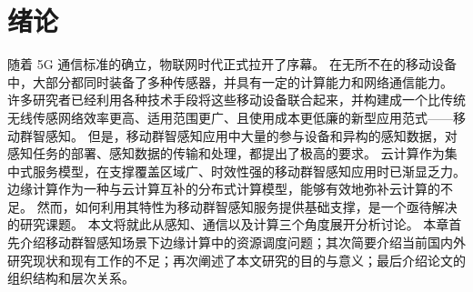 \chapter{绪论}


随着 5G 通信标准的确立，物联网时代正式拉开了序幕。
在无所不在的移动设备中，大部分都同时装备了多种传感器，并具有一定的计算能力和网络通信能力。
许多研究者已经利用各种技术手段将这些移动设备联合起来，并构建成一个比传统无线传感网络效率更高、适用范围更广、且使用成本更低廉的新型应用范式——移动群智感知。
但是，移动群智感知应用中大量的参与设备和异构的感知数据，对感知任务的部署、感知数据的传输和处理，都提出了极高的要求。
云计算作为集中式服务模型，在支撑覆盖区域广、时效性强的移动群智感知应用时已渐显乏力。
边缘计算作为一种与云计算互补的分布式计算模型，能够有效地弥补云计算的不足。
然而，如何利用其特性为移动群智感知服务提供基础支撑，是一个亟待解决的研究课题。
本文将就此从感知、通信以及计算三个角度展开分析讨论。
本章首先介绍移动群智感知场景下边缘计算中的资源调度问题；其次简要介绍当前国内外研究现状和现有工作的不足；再次阐述了本文研究的目的与意义；最后介绍论文的组织结构和层次关系。



